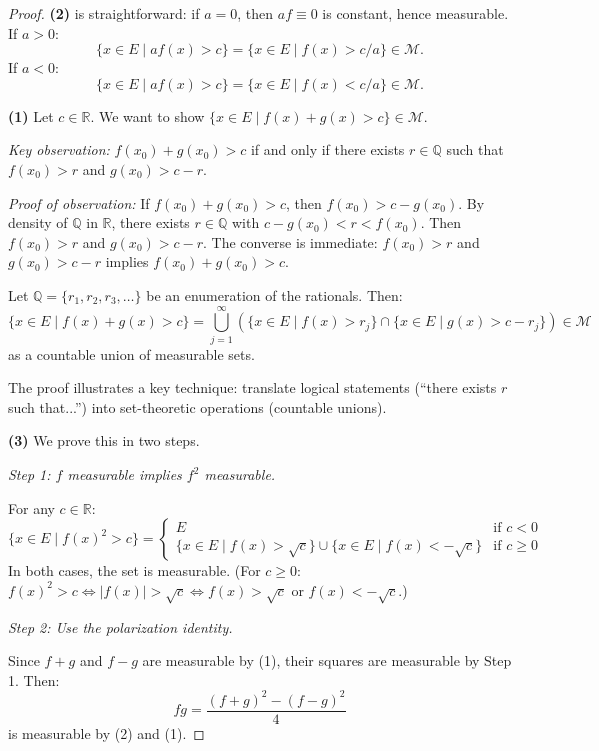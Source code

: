 \documentclass[11pt]{report}
\begin{document}
\begin{proof}
\textbf{(2)} is straightforward: if $a = 0$, then $af \equiv 0$ is constant, hence measurable. If $a > 0$:
\[
\{x \in E \mid af(x) > c\} = \{x \in E \mid f(x) > c/a\} \in \mathcal{M}.
\]
If $a < 0$:
\[
\{x \in E \mid af(x) > c\} = \{x \in E \mid f(x) < c/a\} \in \mathcal{M}.
\]

\textbf{(1)} Let $c \in \mathbb{R}$. We want to show $\{x \in E \mid f(x) + g(x) > c\} \in \mathcal{M}$.

\textit{Key observation:} $f(x_0) + g(x_0) > c$ if and only if there exists $r \in \mathbb{Q}$ such that $f(x_0) > r$ and $g(x_0) > c - r$.

\textit{Proof of observation:} If $f(x_0) + g(x_0) > c$, then $f(x_0) > c - g(x_0)$. By density of $\mathbb{Q}$ in $\mathbb{R}$, there exists $r \in \mathbb{Q}$ with $c - g(x_0) < r < f(x_0)$. Then $f(x_0) > r$ and $g(x_0) > c - r$. The converse is immediate: $f(x_0) > r$ and $g(x_0) > c - r$ implies $f(x_0) + g(x_0) > c$.

Let $\mathbb{Q} = \{r_1, r_2, r_3, \ldots\}$ be an enumeration of the rationals. Then:
\[
\{x \in E \mid f(x) + g(x) > c\} = \bigcup_{j=1}^{\infty} \left(\{x \in E \mid f(x) > r_j\} \cap \{x \in E \mid g(x) > c - r_j\}\right) \in \mathcal{M}
\]
as a countable union of measurable sets.

\begin{rembox}
The proof illustrates a key technique: translate logical statements (``there exists $r$ such that...'') into set-theoretic operations (countable unions).
\end{rembox}

\textbf{(3)} We prove this in two steps.

\textit{Step 1: $f$ measurable implies $f^2$ measurable.}

For any $c \in \mathbb{R}$:
\[
\{x \in E \mid f(x)^2 > c\} = \begin{cases}
E & \text{if } c < 0 \\[1ex]
\{x \in E \mid f(x) > \sqrt{c}\} \cup \{x \in E \mid f(x) < -\sqrt{c}\} & \text{if } c \geq 0
\end{cases}
\]
In both cases, the set is measurable. (For $c \geq 0$: $f(x)^2 > c \iff |f(x)| > \sqrt{c} \iff f(x) > \sqrt{c}$ or $f(x) < -\sqrt{c}$.)

\textit{Step 2: Use the polarization identity.}

Since $f + g$ and $f - g$ are measurable by (1), their squares are measurable by Step 1. Then:
\[
fg = \frac{(f + g)^2 - (f - g)^2}{4}
\]
is measurable by (2) and (1).
\end{proof}
\end{document}
